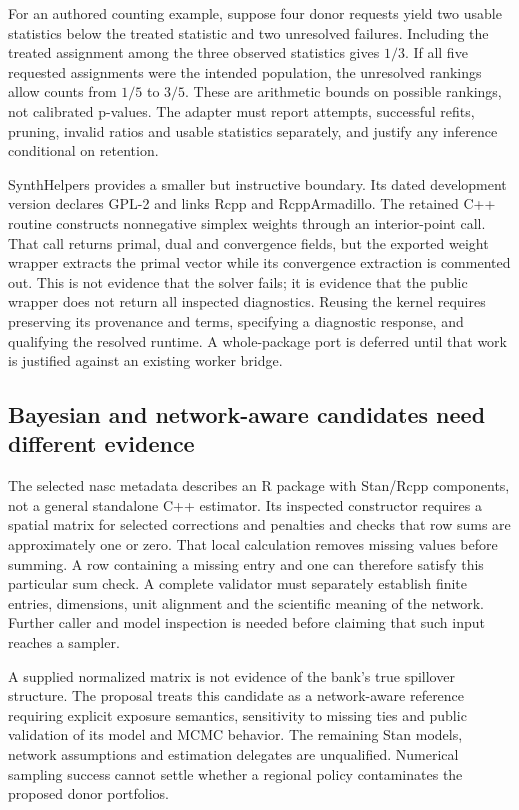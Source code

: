 For an authored counting example, suppose four donor requests yield two
usable statistics below the treated statistic and two unresolved failures.
Including the treated assignment among the three observed statistics gives
$1/3$. If all five requested assignments were the intended population,
the unresolved rankings allow counts from $1/5$ to $3/5$. These are arithmetic
bounds on possible rankings, not calibrated p-values. The adapter must
report attempts, successful refits, pruning, invalid ratios and usable
statistics separately, and justify any inference conditional on retention.
\citep{exec25_synthcross_choice}

SynthHelpers provides a smaller but instructive boundary. Its dated
development version declares GPL-2 and links Rcpp and RcppArmadillo.
The retained C++ routine constructs nonnegative simplex weights through
an interior-point call. That call returns primal, dual and convergence
fields, but the exported weight wrapper extracts the primal vector while
its convergence extraction is commented out. This is not evidence that
the solver fails; it is evidence that the public wrapper does not return
all inspected diagnostics. Reusing the kernel requires preserving its
provenance and terms, specifying a diagnostic response, and qualifying
the resolved runtime. A whole-package port is deferred until that work is
justified against an existing worker bridge.~\citep{exec25_synthcross_helpers}

\subsection{Bayesian and network-aware candidates need different evidence}
The selected nasc metadata describes an R package with Stan/Rcpp components,
not a general standalone C++ estimator. Its inspected constructor requires
a spatial matrix for selected corrections and penalties and checks that
row sums are approximately one or zero. That local calculation removes
missing values before summing. A row containing a missing entry and one
can therefore satisfy this particular sum check. A complete validator must
separately establish finite entries, dimensions, unit alignment and the
scientific meaning of the network. Further caller and model inspection
is needed before claiming that such input reaches a sampler.
\citep{exec25_synthcross_nasc,exec25_synthcross_choice}

A supplied normalized matrix is not evidence of the bank's true spillover
structure. The proposal treats this candidate as a network-aware reference
requiring explicit exposure semantics, sensitivity to missing ties and
public validation of its model and MCMC behavior. The remaining Stan models,
network assumptions and estimation delegates are unqualified. Numerical
sampling success cannot settle whether a regional policy contaminates
the proposed donor portfolios.~\citep{exec25_synthcross_choice}

